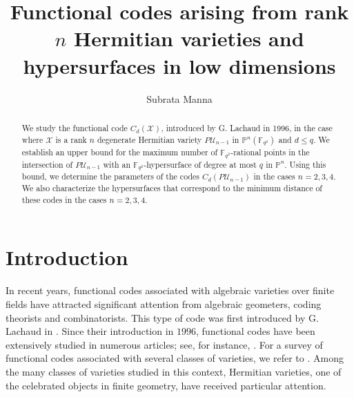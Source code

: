 \documentclass[10pt,a4paper,oneside]{amsproc}
\newcommand{\Fqt}{\mathbb{F}_{q^2}}
\newcommand{\U}{\mathcal{U}}
\def\FF{{\mathbb F}}
\def\PP{{\mathbb P}}
\newcommand{\X}{\mathcal{X}}
\begin{document}
\title[]{Functional codes arising from rank $n$ Hermitian varieties and  hypersurfaces in low dimensions}

\author{Subrata Manna}
\address{Department of Mathematics  \newline \indent
Indian Institute of Technology Bombay, Mumbai, India}



\begin{abstract}   
We study the functional code $C_d(\X)$, introduced by G. Lachaud in 1996, in the case where $\X$ is a rank $n$ degenerate Hermitian variety $P\U_{n-1}$ in $\PP^n(\FF_{q^2})$ and $d\leq q$. We establish an upper bound for the maximum number of $\FF_{q^2}$-rational points in the intersection of $P\U_{n-1}$ with an $\Fqt$-hypersurface of degree at most $q$ in $\PP^n$. Using this bound, we determine the parameters of the codes $C_d(P\U_{n-1})$ in the cases $n=2,3,4$. We also characterize the hypersurfaces that correspond to the minimum distance of these codes in the cases $n=2,3,4$.
\end{abstract}

\date{}
\maketitle

\section{Introduction}\label{intro}
In recent years, functional codes associated with algebraic varieties over finite fields have attracted significant attention from algebraic geometers, coding theorists and combinatorists. This type of code was first introduced by G. Lachaud in \cite{L}. Since their introduction in $1996$, functional codes have been extensively studied in numerous articles; see, for instance, \cite{BD, BDH, E, E1, E2, EHRS, EHRS1}. For a survey of functional codes associated with several classes of varieties, we refer to \cite{L08}. Among the many classes of varieties studied in this context, Hermitian varieties, one of the celebrated objects in finite geometry, have received particular attention. 
\end{document}
